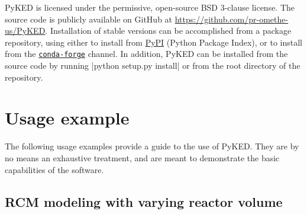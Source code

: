 \documentclass[12pt]{ussci}
\newcommand\pk{PyKED}
\begin{document}
\pk{} is licensed under the permissive, open-source BSD 3-clause license. The
source code is publicly available on GitHub at
\url{https://github.com/pr-omethe-us/PyKED}. Installation of stable versions can
be accomplished from a package repository, using either  to install
from \href{https://pypi.python.org/pypi}{PyPI} (Python Package Index), or
 to install from the
\href{https://anaconda.org/conda-forge}{\texttt{conda-forge}} channel. In
addition, \pk{} can be installed from the source code by running
\pybox|python setup.py install| or  from the root
directory of the repository.

\section{Usage example}\label{sec:usage-example}

The following usage examples provide a guide to the use of \pk{}. They are by no
means an exhaustive treatment, and are meant to demonstrate the basic
capabilities of the software.

\subsection{RCM modeling with varying reactor volume}\label{sec:rcm-modeling}
\end{document}
